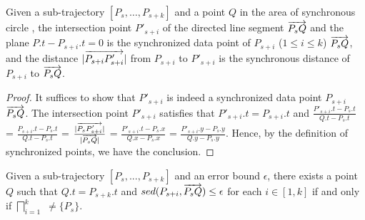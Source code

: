 




\begin{prop}
\label{prop-3d-syn-point}
Given a sub-trajectory $[P_s, \ldots, P_{s+k}]$ and a point $Q$ in the area of synchronous circle , the intersection point $P'_{s+i}$ of the directed line segment $\protect\overrightarrow{P_sQ}$ and the plane $P.t - P_{s+i}.t = 0$ is the synchronized data point of $P_{s+i}$ ($1\le i\le k$) \wrt  $\protect\overrightarrow{P_sQ}$, and the distance $|\protect\overrightarrow{P_{s+i}P'_{s+i}}|$ from $P_{s+i}$ to $P'_{s+i}$ is the synchronous distance of $P_{s+i}$ to $\protect\overrightarrow{P_sQ}$.
\end{prop}

\begin{proof} It suffices to show that $P'_{s+i}$ is indeed a synchronized data point $P_{s+i}$ \wrt $\protect\overrightarrow{P_sQ}$.
%
The intersection point $P'_{s+i}$ satisfies that $P'_{s+i}.t = P_{s+i}.t$ and
$\frac{P'_{s+i}.t - P_{s}.t}{Q.t - P_{s}.t}$ = $\frac{P_{s+i}.t - P_{s}.t}{Q.t - P_{s}.t}$  =
$\frac{|\protect\overrightarrow{P_sP'_{s+i}}|}{|\protect\overrightarrow{P_sQ}|}$ =
$\frac{P'_{s+i}.t - P_{s}.x}{Q.x - P_{s}.x}$ = $\frac{P'_{s+i}.y - P_{s}.y}{Q.y - P_{s}.y}$.
%
Hence, by the definition of synchronized points, we have the conclusion.
\end{proof}






\begin{prop}
\label{prop-3d-ci}
Given a sub-trajectory $[P_s,...,P_{s+k}]$ and an error bound $\epsilon$, there exists a point $Q$ such that $Q.t = P_{s+k}.t$ and $sed(P_{s+i}, \protect\overrightarrow{P_sQ})\le \epsilon$ for each $i \in [1,k]$ if and only if $\bigsqcap_{i=1}^{k}$ $\ne \{P_s\}$.
\end{prop}

